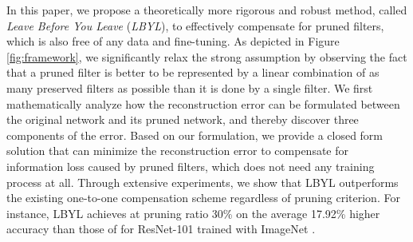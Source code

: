 In this paper, we propose a theoretically more rigorous and robust method, called \textit{Leave Before You Leave} (\textit{LBYL}), to effectively compensate for pruned filters, which is also free of any data and fine-tuning. As depicted in Figure \ref{fig:framework}, we significantly relax the strong assumption by observing the fact that a pruned filter is better to be represented by a linear combination of as many preserved filters as possible than it is done by a single filter. We first mathematically analyze how the reconstruction error can be formulated between the original network and its pruned network, and thereby discover three components of the error. Based on our formulation, we provide a closed form solution that can minimize the reconstruction error to compensate for information loss caused by pruned filters, which does not need any training process at all. Through extensive experiments, we show that LBYL outperforms the existing one-to-one compensation scheme \cite{NM} regardless of pruning criterion. For instance, LBYL achieves at pruning ratio 30\% on the average 17.92\% higher accuracy than those of \cite{NM} for ResNet-101 \cite{ResNet} trained with ImageNet \cite{deng2009imagenet}.












